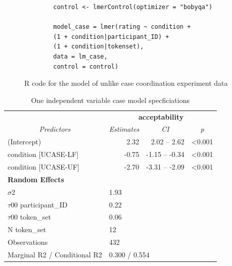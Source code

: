 \begin{figure}[!h]
	\lstset{
		language=R,
		escapechar=@,
		basicstyle=\small\ttfamily,
		columns=fullflexible,
		keepspaces=true
	}
	\begin{lstlisting}
		control <- lmerControl(optimizer = "bobyqa")
		
		model_case = lmer(rating ~ condition + 
		(1 + condition|participant_ID) +
		(1 + condition|tokenset), 
		data = lm_case,
		control = control)\end{lstlisting}
	\caption{R code for the model of unlike case coordination experiment data}
	\label{fig:R_casemodel}
\end{figure}


\begin{table}[!h]
	\centering
	\begin{tabular}{llrr}
		\hline \hline
		\multicolumn{1}{c}{\textbf{}} & \multicolumn{3}{c}{\textbf{acceptability}}                          \\
		\multicolumn{1}{c}{\textit{Predictors}} & \multicolumn{1}{c}{\textit{Estimates}} & \multicolumn{1}{c}{\textit{CI}} & \multicolumn{1}{c}{\textit{p}} \\ \hline
		(Intercept)                   & \multicolumn{1}{r}{2.32}  &2.02 -- 2.62   & \textless{}0.001 \\
		condition {[}UCASE-LF{]}        & \multicolumn{1}{r}{-0.75} &-1.15 -- -0.34 & \textless{}0.001 \\
		condition {[}UCASE-UF{]}        & \multicolumn{1}{r}{-2.70} & -3.31 – -2.09 & \textless{}0.001 \\
		\multicolumn{4}{l}{\textbf{Random Effects}}                                                  \\
		$\sigma$2                            & \multicolumn{3}{l}{1.93}                                     \\
		$\tau$00 participant\_ID           & \multicolumn{3}{l}{0.22}                                     \\
		$\tau$00 token\_set                & \multicolumn{3}{l}{0.06}                                     \\
		N token\_set                  & \multicolumn{3}{l}{12}                                       \\ \hline
		Observations                  & \multicolumn{3}{l}{432}                                      \\
		Marginal R2 / Conditional R2  & \multicolumn{3}{l}{0.300 / 0.554}  \\ \hline \hline                      
	\end{tabular}
	\caption{One independent variable case model specficiations}
	\label{tab:lmcase_model}
\end{table}


